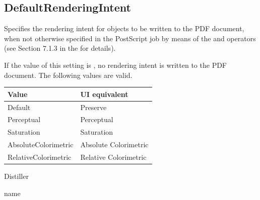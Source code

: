 \documentclass[letterpaper,12pt,english,openany,oneside]{sphinxmanual}
\begin{document}
\begin{sphinxVerbatim}[commandchars=\\\{\}]
\end{sphinxVerbatim}




\subsection{DefaultRenderingIntent}
\label{\detokenize{PDF_Create_CommonSettings:defaultrenderingintent}}
Specifies the rendering intent for objects to be written to the PDF document, when not otherwise specified in the PostScript job by means of the  and  operators (see Section 7.1.3 in the  for details).

If the value of this setting is  , no rendering intent is written to the PDF document. The following values are valid.


\begin{savenotes}\sphinxattablestart
\centering
{}\label{\detokenize{PDF_Create_CommonSettings:section-16}}\nobreak
\begin{tabulary}{\linewidth}[t]{|T|T|}
\hline
\sphinxstyletheadfamily 
Value
&\sphinxstyletheadfamily 
UI equivalent
\\
\hline
Default
&
Preserve
\\
\hline
Perceptual
&
Perceptual
\\
\hline
Saturation
&
Saturation
\\
\hline
AbsoluteColorimetric
&
Absolute Colorimetric
\\
\hline
RelativeColorimetric
&
Relative Colorimetric
\\
\hline
\end{tabulary}
\par
\sphinxattableend\end{savenotes}
\label{\detokenize{PDF_Create_CommonSettings:supported-by-79}}

Distiller

\label{\detokenize{PDF_Create_CommonSettings:type-78}}

name

\label{\detokenize{PDF_Create_CommonSettings:ui-name-65}}
\end{document}
